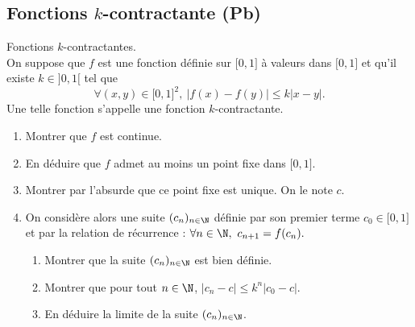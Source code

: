 \subsection{Fonctions $k$-contractante (Pb)}

\begin{exercice}  \;
Fonctions $k$-contractantes.\\
\noindent On suppose que $f$ est une fonction d\'efinie sur $\lbrack 0,1\rbrack$ \`a valeurs dans $\lbrack 0,1\rbrack$ et qu'il existe $k\in\rbrack 0,1\lbrack$ tel que
$$\forall (x,y)\in\lbrack 0,1\rbrack^2,\ |f(x)-f(y)|\leq k|x-y|.$$
Une telle fonction s'appelle une fonction $k$-contractante.
\begin{enumerate}
\item Montrer que $f$ est continue. 
\item En déduire que $f$ admet au moins un point fixe dans $\lbrack 0,1\rbrack$. 
\item Montrer par l'absurde que ce point fixe est unique. On le note $c$.  

\item 
On consid\`ere alors une suite $(c_n)_{n\in\N}$ d\'efinie par son premier terme $c_0\in\lbrack 0,1\rbrack$ et par la relation de r\'ecurrence  : $\forall n\in\N,\ c_{n+1}=f(c_n).$
\begin{enumerate}
\item Montrer que la suite $(c_n)_{n\in\N}$ est bien d\'efinie.
\item Montrer que pour tout $n\in\N$, $|c_n-c|\leq k^n|c_0-c|$. 
\item En d\'eduire la limite de la suite $(c_n)_{n\in\N}$.
\end{enumerate}
\end{enumerate}
\end{exercice}



